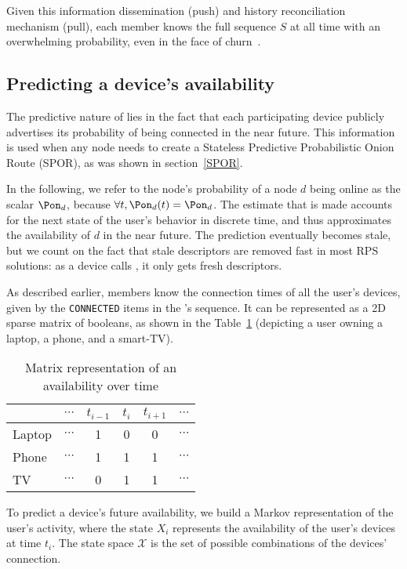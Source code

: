 Given this information dissemination (push) and history reconciliation mechanism (pull), each \squad member knows the full sequence $S$ at all time with an overwhelming probability, even in the face of churn~\cite{luxey:cascade}.

\subsection{Predicting a device's availability}
\label{ssec:device_availability}

The predictive nature of \name lies in the fact that each participating device publicly advertises its probability of being connected in the near future. 
This information is used when any node needs to create a Stateless Predictive Probabilistic Onion Route (\acs{SPOR}), as was shown in section~\ref{SPOR}.

In the following, we refer to the node's probability of a node $d$ being online as the scalar $\Pon_d$, because $\forall t, \Pon_d(t) = \Pon_d$.
The estimate that is made accounts for the next state of the user's behavior in discrete time, and thus approximates the availability of $d$ in the near future.
The prediction eventually becomes stale, but we count on the fact that stale descriptors are removed fast in most RPS solutions: 
as a device calls \GetRandomNode, it only gets fresh descriptors.

As described earlier, \squad members know the connection times of all the user's devices, given by the \texttt{CONNECTED} items in the \squad's sequence.
It can be represented as a 2D sparse matrix of booleans, as shown in the Table~\ref{tab:connection_times} (depicting a user owning a laptop, a phone, and a smart-TV).


\begin{table}
\caption{Matrix representation of an \squad availability over time}
\centering
\begin{tabular}{@{}lccccc@{}} \toprule
		& $\cdots$	& $t_{i-1}$	& $t_i$		& $t_{i+1}$	& $\cdots$ \\ \midrule
Laptop	& $\cdots$	& 1			& 0			& 0			& $\cdots$ \\
Phone	& $\cdots$	& 1			& 1			& 1			& $\cdots$ \\
TV		& $\cdots$	& 0			& 1			& 1			& $\cdots$ \\ \bottomrule
\end{tabular}
\label{tab:connection_times}
\end{table}

To predict a device's future availability, we build a Markov representation of the user's activity, 
where the state $X_i$ represents the availability of the user's devices at time $t_i$.
The state space $\mathcal{X}$ is the set of possible combinations of the devices' connection.

